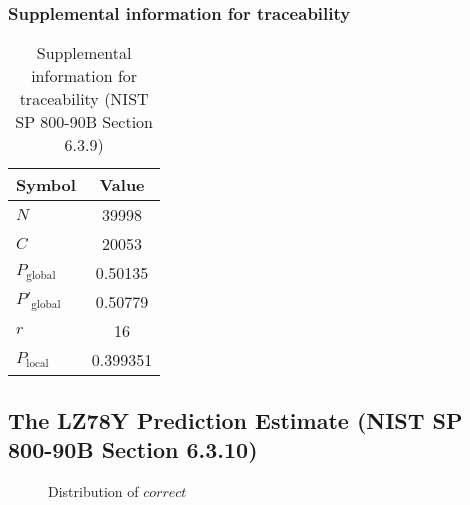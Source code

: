 \documentclass[a3paper,xelatex,english]{bxjsarticle}
\begin{document}
\subsubsection{Supplemental information for traceability}
\renewcommand{\arraystretch}{1.8}
\begin{table}[h]
\caption{Supplemental information for traceability (NIST SP 800-90B Section 6.3.9)}
\begin{center}
\begin{tabular}{|l|c|}
\hline 
\rowcolor{anotherlightblue} %
Symbol				& Value \\ \hline 
$N$				& 39998\\ \hline 
$C$				& 20053\\ \hline 
$P_{\textrm{global}}$				&  0.50135\\ \hline 
$P'_{\textrm{global}}$			&  0.50779\\ \hline 
$r$				& 16\\ \hline 
$P_{\textrm{local}}$ 			& 0.399351\\ \hline
\end{tabular}
\end{center}
\end{table}
\renewcommand{\arraystretch}{1.4}
\clearpage
\subsection{The LZ78Y Prediction Estimate (NIST SP 800-90B Section 6.3.10)}
\begin{figure}[htbp]
\centering

\caption{Distribution of $correct$}
\end{figure}
\end{document}
